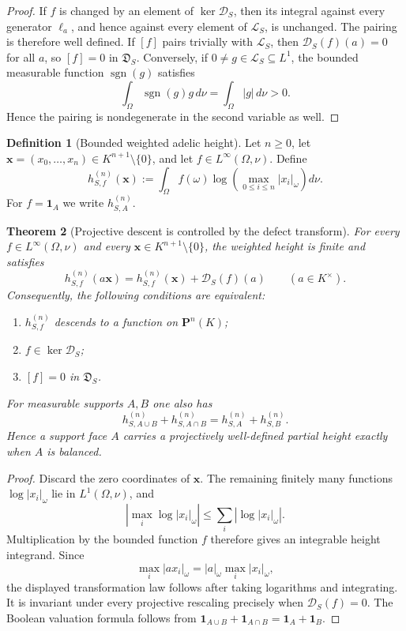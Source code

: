 \documentclass[11pt]{amsart}
\numberwithin{equation}{section}
\newtheorem{theorem}{Theorem}[section]
\theoremstyle{definition}
\newtheorem{definition}[theorem]{Definition}
\begin{document}
\begin{proof}
If $f$ is changed by an element of $\ker\mathscr D_S$, then its integral
against every generator $\ell_a$, and hence against every element of
$\mathscr L_S$, is unchanged.  The pairing is therefore well defined.
If $[f]$ pairs trivially with $\mathscr L_S$, then
$\mathscr D_S(f)(a)=0$ for all $a$, so $[f]=0$ in $\mathfrak D_S$.
Conversely, if $0\neq g\in\mathscr L_S\subseteq L^1$, the bounded
measurable function $\operatorname{sgn}(g)$ satisfies
\[
\int_\Omega \operatorname{sgn}(g)g\,d\nu
=\int_\Omega|g|\,d\nu>0.
\]
Hence the pairing is nondegenerate in the second variable as well.
\end{proof}

\begin{definition}[Bounded weighted adelic height]
\label{def:weighted-adelic-height}
Let $n\geq0$, let
$\mathbf x=(x_0,\dots,x_n)\in K^{n+1}\setminus\{0\}$, and let
$f\in L^\infty(\Omega,\nu)$.  Define
\[
h_{S,f}^{(n)}(\mathbf x)
:=\int_\Omega f(\omega)
\log\!\left(\max_{0\leq i\leq n}|x_i|_\omega\right)d\nu.
\]
For $f=\mathbf1_A$ we write $h_{S,A}^{(n)}$.
\end{definition}

\begin{theorem}[Projective descent is controlled by the defect transform]
\label{thm:weighted-height-projective-descent}
For every $f\in L^\infty(\Omega,\nu)$ and every
$\mathbf x\in K^{n+1}\setminus\{0\}$, the weighted height is finite and
satisfies
\[
\boxed{
h_{S,f}^{(n)}(a\mathbf x)
=h_{S,f}^{(n)}(\mathbf x)+\mathscr D_S(f)(a)
\qquad(a\in K^\times).
}
\]
Consequently, the following conditions are equivalent:
\begin{enumerate}[label=\textup{(\roman*)}]
\item $h_{S,f}^{(n)}$ descends to a function on $\mathbf P^n(K)$;
\item $f\in\ker\mathscr D_S$;
\item $[f]=0$ in $\mathfrak D_S$.
\end{enumerate}
For measurable supports $A,B$ one also has
\[
h_{S,A\cup B}^{(n)}+h_{S,A\cap B}^{(n)}
=h_{S,A}^{(n)}+h_{S,B}^{(n)}.
\]
Hence a support face $A$ carries a projectively well-defined partial
height exactly when $A$ is balanced.
\end{theorem}

\begin{proof}
Discard the zero coordinates of $\mathbf x$.  The remaining finitely many
functions $\log|x_i|_\omega$ lie in $L^1(\Omega,\nu)$, and
\[
\left|\max_i\log|x_i|_\omega\right|
\leq\sum_i\left|\log|x_i|_\omega\right|.
\]
Multiplication by the bounded function $f$ therefore gives an integrable
height integrand.  Since
\[
\max_i|a x_i|_\omega
=|a|_\omega\max_i|x_i|_\omega,
\]
the displayed transformation law follows after taking logarithms and
integrating.  It is invariant under every projective rescaling precisely
when $\mathscr D_S(f)=0$.  The Boolean valuation formula follows from
$\mathbf1_{A\cup B}+\mathbf1_{A\cap B}
=\mathbf1_A+\mathbf1_B$.
\end{proof}
\end{document}
